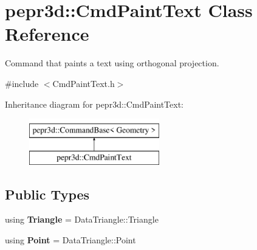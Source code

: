 \hypertarget{classpepr3d_1_1_cmd_paint_text}{}\section{pepr3d\+::Cmd\+Paint\+Text Class Reference}
\label{classpepr3d_1_1_cmd_paint_text}


Command that paints a text using orthogonal projection.  




{\ttfamily \#include $<$Cmd\+Paint\+Text.\+h$>$}

Inheritance diagram for pepr3d\+::Cmd\+Paint\+Text\+:\begin{figure}[H]
\begin{center}
\leavevmode
\includegraphics[height=2.000000cm]{classpepr3d_1_1_cmd_paint_text}
\end{center}
\end{figure}
\subsection*{Public Types}
\begin{DoxyCompactItemize}
\item 
\mbox{\label{classpepr3d_1_1_cmd_paint_text_a41290460fb79bcf24bf69527fc5cdd42}} 
using {\bfseries Triangle} = Data\+Triangle\+::\+Triangle
\item 
\mbox{\label{classpepr3d_1_1_cmd_paint_text_a9a40bd26f122370011e8d4526e7e7758}} 
using {\bfseries Point} = Data\+Triangle\+::\+Point
\end{DoxyCompactItemize}
